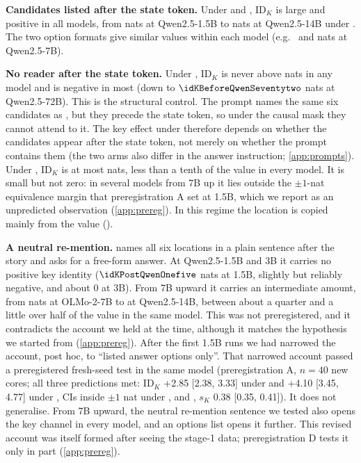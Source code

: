 \textbf{Candidates listed after the state token.} Under \fmtOpt{} and \fmtLetter{}, $\mathrm{ID}_K$ is large and positive in all \nModels{} models, from \idKOptQwenOnefive{} nats at Qwen2.5-1.5B to \idKOptQwenFourteen{} nats at Qwen2.5-14B under \fmtOpt{}. The two option formats give similar values within each model (e.g.\ \idKOptQwenSeven{} and \idKLetterQwenSeven{} nats at Qwen2.5-7B).

\textbf{No reader after the state token.} Under \fmtBefore{}, $\mathrm{ID}_K$ is never above \beforeMax{} nats in any model and is negative in most (down to $\idKBeforeQwenSeventytwo$ nats at Qwen2.5-72B). This is the structural control. The prompt names the same six candidates as \fmtOpt{}, but they precede the state token, so under the causal mask they cannot attend to it. The key effect under \fmtOpt{} therefore depends on whether the candidates appear after the state token, not merely on whether the prompt contains them (the two arms also differ in the answer instruction; \cref{app:prompts}). Under \fmtNone{}, $\mathrm{ID}_K$ is at most \noneMax{} nats, less than a tenth of the \fmtOpt{} value in every model. It is small but not zero: in several models from 7B up it lies outside the $\pm 1$-nat equivalence margin that preregistration A set at 1.5B, which we report as an unpredicted observation (\cref{app:prereg}). In this regime the location is copied mainly from the value ().

\textbf{A neutral re-mention.} \fmtPost{} names all six locations in a plain sentence after the story and asks for a free-form answer. At Qwen2.5-1.5B and 3B it carries no positive key identity ($\idKPostQwenOnefive$ nats at 1.5B, slightly but reliably negative, and about 0 at 3B). From 7B upward it carries an intermediate amount, from \idKPostOlmoSeven{} nats at OLMo-2-7B to \idKPostQwenFourteen{} at Qwen2.5-14B, between about a quarter and a little over half of the \fmtOpt{} value in the same model. This was not preregistered, and it contradicts the account we held at the time, although it matches the hypothesis we started from (\cref{app:prereg}). After the first 1.5B runs we had narrowed the account, post hoc, to ``listed answer options only''. That narrowed account passed a preregistered fresh-seed test in the same model (preregistration A, $n = 40$ new cores; all three predictions met: $\mathrm{ID}_K$ +2.85 [2.38, 3.33] under \fmtOpt{} and +4.10 [3.45, 4.77] under \fmtLetter{}, CIs inside $\pm 1$ nat under \fmtNone{}, \fmtBefore{} and \fmtPost{}, $s_K$ 0.38 [0.35, 0.41]). It does not generalise. From 7B upward, the neutral re-mention sentence we tested also opens the key channel in every model, and an options list opens it further. This revised account was itself formed after seeing the stage-1 data; preregistration D tests it only in part (\cref{app:prereg}).

